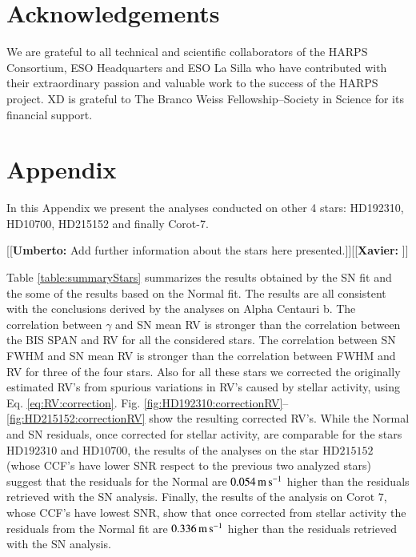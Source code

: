 \documentclass{aa}
\def\ms{\hbox{\,m\,s$^{-1}$}}         %
\newcommand{\xavier}[1]{{\color{blue}[[\textbf{Xavier: }#1]]}}
\newcommand{\umberto}[1]{{\color{green}[[\textbf{Umberto: }#1]]}}
\begin{document}
\section{Acknowledgements}

We are grateful to all technical and scientific collaborators of the HARPS Consortium, ESO Headquarters and ESO La Silla who have contributed with their extraordinary passion and valuable work to the success of the HARPS project.
XD is grateful to The Branco Weiss Fellowship--Society in Science for its financial support.


\appendix
\section{Appendix} \label{appendix}

In this Appendix we present the analyses conducted on other 4 stars: HD192310, HD10700, HD215152 and finally Corot-7. 

\umberto{Add further information about the stars here presented.}\xavier{}

Table \ref{table:summaryStars} summarizes the results obtained by the SN fit and the some of the results based on the Normal fit. The results are all consistent with the conclusions derived by the analyses on Alpha Centauri b. The correlation between $\gamma$ and SN mean RV is stronger than the correlation between the BIS SPAN and RV for all the considered stars. The correlation between SN FWHM and SN mean RV is stronger than the correlation between FWHM and RV for three of the four stars.  Also for all these stars we corrected the originally estimated RV's from spurious variations in RV's caused by stellar activity, using Eq. \ref{eq:RV:correction}. Fig. \ref{fig:HD192310:correctionRV}--\ref{fig:HD215152:correctionRV} show the resulting corrected RV's. While the Normal and SN residuals, once corrected for stellar activity, are comparable for the stars $\text{HD}192310$ and $\text{HD}10700$, the results of the analyses on the star $\text{HD}215152$ (whose CCF's have lower SNR respect to the previous two analyzed stars) suggest that the residuals for the Normal are $0.054 \ms$ higher than the residuals retrieved with the SN analysis. Finally, the results of the analysis on $\text{Corot }7$, whose CCF's have lowest SNR, show that once corrected from stellar activity the residuals from the Normal fit are $0.336 \ms$ higher than the residuals retrieved with the SN analysis.
\end{document}
